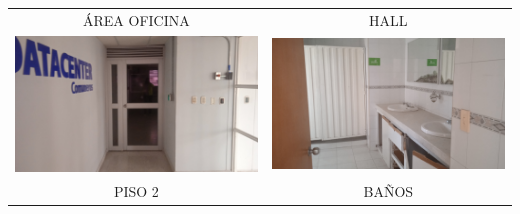 \documentclass[12pt,a4paper,twoside]{article}
\begin{document}
{\begin{tabular}{ c c }
	ÁREA OFICINA & HALL\\
	\includegraphics[width = 7 cm]{Imagenes/15} & \includegraphics[width = 7 cm]{Imagenes/16} \\
	PISO 2  &  BAÑOS\\

	
\end{tabular} 

\begin{tabular}{ c c }
	

\end{tabular}}
\end{document}
